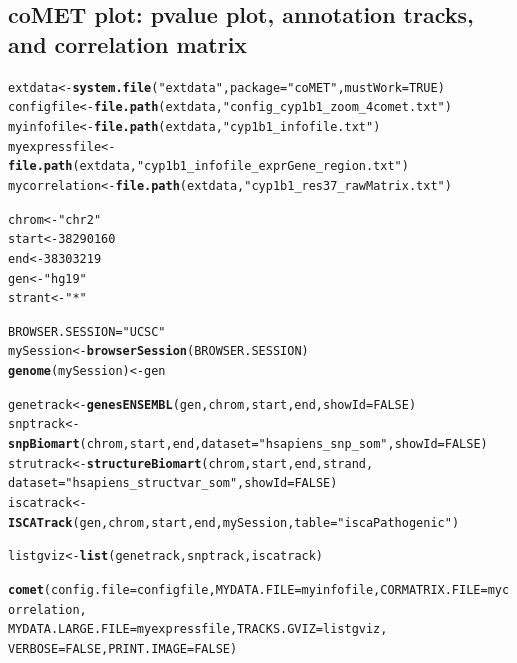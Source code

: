 \documentclass[11pt]{article}\usepackage[]{graphicx}\usepackage[usenames,dvipsnames]{color}
\makeatletter
\newcommand{\hlnum}[1]{\textcolor[rgb]{0.686,0.059,0.569}{#1}}%
\newcommand{\hlstr}[1]{\textcolor[rgb]{0.192,0.494,0.8}{#1}}%
\newcommand{\hlstd}[1]{\textcolor[rgb]{0.345,0.345,0.345}{#1}}%
\newcommand{\hlkwb}[1]{\textcolor[rgb]{0.69,0.353,0.396}{#1}}%
\newcommand{\hlkwc}[1]{\textcolor[rgb]{0.333,0.667,0.333}{#1}}%
\newcommand{\hlkwd}[1]{\textcolor[rgb]{0.737,0.353,0.396}{\textbf{#1}}}%
\newenvironment{kframe}{%
 \def\at@end@of@kframe{}%
 \ifinner\ifhmode%
  \def\at@end@of@kframe{\end{minipage}}%
  \begin{minipage}{\columnwidth}%
 \fi\fi%
 \def\FrameCommand##1{\hskip\@totalleftmargin \hskip-\fboxsep
 \colorbox{shadecolor}{##1}\hskip-\fboxsep
     \hskip-\linewidth \hskip-\@totalleftmargin \hskip\columnwidth}%
 \MakeFramed {\advance\hsize-\width
   \@totalleftmargin\z@ \linewidth\hsize
   \@setminipage}}%
 {\par\unskip\endMakeFramed%
 \at@end@of@kframe}
\newenvironment{knitrout}{}{} %
\makeatother
\begin{document}
\subsection{coMET plot: pvalue plot, annotation tracks, and correlation matrix}
\begin{knitrout}
\color{fgcolor}\begin{kframe}
\begin{alltt}
\hlstd{extdata} \hlkwb{<-} \hlkwd{system.file}\hlstd{(}\hlstr{"extdata"}\hlstd{,} \hlkwc{package}\hlstd{=}\hlstr{"coMET"}\hlstd{,}\hlkwc{mustWork}\hlstd{=}\hlnum{TRUE}\hlstd{)}
\hlstd{configfile} \hlkwb{<-} \hlkwd{file.path}\hlstd{(extdata,} \hlstr{"config_cyp1b1_zoom_4comet.txt"}\hlstd{)}
\hlstd{myinfofile} \hlkwb{<-} \hlkwd{file.path}\hlstd{(extdata,} \hlstr{"cyp1b1_infofile.txt"}\hlstd{)}
\hlstd{myexpressfile} \hlkwb{<-} \hlkwd{file.path}\hlstd{(extdata,} \hlstr{"cyp1b1_infofile_exprGene_region.txt"}\hlstd{)}
\hlstd{mycorrelation} \hlkwb{<-} \hlkwd{file.path}\hlstd{(extdata,} \hlstr{"cyp1b1_res37_rawMatrix.txt"}\hlstd{)}

\hlstd{chrom} \hlkwb{<-} \hlstr{"chr2"}
\hlstd{start} \hlkwb{<-} \hlnum{38290160}
\hlstd{end} \hlkwb{<-} \hlnum{38303219}
\hlstd{gen} \hlkwb{<-} \hlstr{"hg19"}
\hlstd{strant} \hlkwb{<-} \hlstr{"*"}

\hlstd{BROWSER.SESSION}\hlkwb{=}\hlstr{"UCSC"}
\hlstd{mySession} \hlkwb{<-} \hlkwd{browserSession}\hlstd{(BROWSER.SESSION)}
\hlkwd{genome}\hlstd{(mySession)} \hlkwb{<-} \hlstd{gen}

\hlstd{genetrack} \hlkwb{<-}\hlkwd{genesENSEMBL}\hlstd{(gen,chrom,start,end,}\hlkwc{showId}\hlstd{=}\hlnum{FALSE}\hlstd{)}
\hlstd{snptrack} \hlkwb{<-} \hlkwd{snpBiomart}\hlstd{(chrom, start, end,} \hlkwc{dataset}\hlstd{=}\hlstr{"hsapiens_snp_som"}\hlstd{,}\hlkwc{showId}\hlstd{=}\hlnum{FALSE}\hlstd{)}
\hlstd{strutrack} \hlkwb{<-} \hlkwd{structureBiomart}\hlstd{(chrom, start, end, strand,}
                              \hlkwc{dataset}\hlstd{=}\hlstr{"hsapiens_structvar_som"}\hlstd{,}\hlkwc{showId}\hlstd{=}\hlnum{FALSE}\hlstd{)}
\hlstd{iscatrack} \hlkwb{<-}\hlkwd{ISCATrack}\hlstd{(gen,chrom,start,end,mySession,} \hlkwc{table}\hlstd{=}\hlstr{"iscaPathogenic"}\hlstd{)}

\hlstd{listgviz} \hlkwb{<-} \hlkwd{list}\hlstd{(genetrack,snptrack,iscatrack)}


\hlkwd{comet}\hlstd{(}\hlkwc{config.file}\hlstd{=configfile,} \hlkwc{MYDATA.FILE}\hlstd{=myinfofile,} \hlkwc{CORMATRIX.FILE}\hlstd{=mycorrelation,}
      \hlkwc{MYDATA.LARGE.FILE}\hlstd{=myexpressfile,} \hlkwc{TRACKS.GVIZ}\hlstd{=listgviz,}
      \hlkwc{VERBOSE}\hlstd{=}\hlnum{FALSE}\hlstd{,} \hlkwc{PRINT.IMAGE}\hlstd{=}\hlnum{FALSE}\hlstd{)}
\end{alltt}
\end{kframe}
\end{knitrout}
\end{document}

